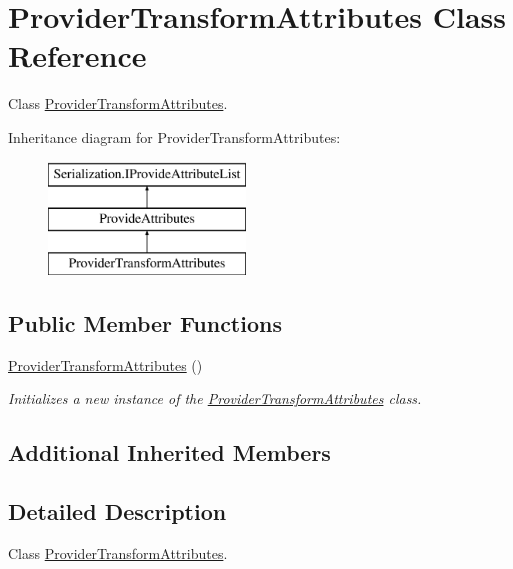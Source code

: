 \hypertarget{class_provider_transform_attributes}{}\section{Provider\+Transform\+Attributes Class Reference}
\label{class_provider_transform_attributes}


Class \hyperlink{class_provider_transform_attributes}{Provider\+Transform\+Attributes}.  


Inheritance diagram for Provider\+Transform\+Attributes\+:\begin{figure}[H]
\begin{center}
\leavevmode
\includegraphics[height=3.000000cm]{class_provider_transform_attributes}
\end{center}
\end{figure}
\subsection*{Public Member Functions}
\begin{DoxyCompactItemize}
\item 
\hyperlink{class_provider_transform_attributes_abe82df40bd69bae09ae373516d1e2bf1}{Provider\+Transform\+Attributes} ()
\begin{DoxyCompactList}\small\item\em Initializes a new instance of the \hyperlink{class_provider_transform_attributes}{Provider\+Transform\+Attributes} class. \end{DoxyCompactList}\end{DoxyCompactItemize}
\subsection*{Additional Inherited Members}


\subsection{Detailed Description}
Class \hyperlink{class_provider_transform_attributes}{Provider\+Transform\+Attributes}. 




